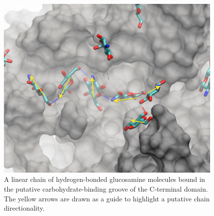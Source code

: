 \begin{figure}[htbp]
\centering
\includegraphics[width=6.25in]{figures/results4/glucosamine_binding_direction_suggestive.pdf}
\caption[Polymer directionality]{A linear chain of hydrogen-bonded glucosamine molecules bound in the putative carbohydrate-binding groove of the C-terminal domain.  The yellow arrows are drawn as a guide to highlight a putative chain directionality.}
\label{fig:directionality}
\end{figure}

\begin{singlespace}


\end{singlespace}




